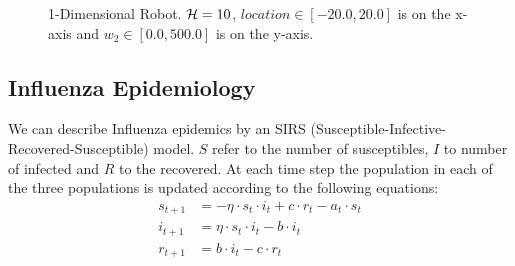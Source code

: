\begin{figure}[h!]
    \centering
    \caption{1-Dimensional Robot. $ \mathcal{H} = 10 $, $ location \in \left[ -20.0, 20.0 \right]$ is on the x-axis and $ w_2 \in \left[ 0.0, 500.0 \right]$ is on the y-axis. }
    \label{fig:robot1d}
\end{figure}

\subsection{Influenza Epidemiology}
\label{sec:results_ee}

We can describe Influenza epidemics by an SIRS (Susceptible-Infective-Recovered-Susceptible) model. {\footnotesize $ S $} refer to the number of susceptibles, {\footnotesize $ I $} to number of infected and {\footnotesize $ R $} to the recovered. At each time step the population in each of the three populations is updated according to the following equations:
\begin{align*}
    s_{t + 1} &= -\eta \cdot s_t \cdot i_t + c \cdot r_t - a_t \cdot s_t \\
    i_{t + 1} &= \eta \cdot s_t \cdot i_t - b \cdot i_t \\
    r_{t+1} &= b \cdot i_t - c \cdot r_t 
\end{align*}

